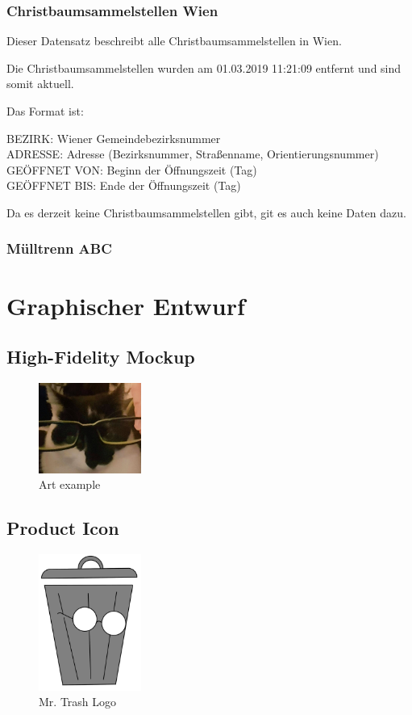 \documentclass[12pt, a4paper]{scrreprt}
\begin{document}
\subsection{Christbaumsammelstellen Wien \cite{christbaumsammelstellen}}
    Dieser Datensatz beschreibt alle Christbaumsammelstellen in Wien.

    Die Christbaumsammelstellen wurden am 01.03.2019 11:21:09 entfernt und sind somit aktuell.

    Das Format ist:
    \begin{tcolorbox}
        BEZIRK: Wiener Gemeindebezirksnummer\\
        ADRESSE: Adresse (Bezirksnummer, Straßenname, Orientierungsnummer)\\
        GEÖFFNET VON: Beginn der Öffnungszeit (Tag)\\
        GEÖFFNET BIS: Ende der Öffnungszeit (Tag) 
    \end{tcolorbox}
    
    Da es derzeit keine Christbaumsammelstellen gibt, git es auch keine Daten dazu.
\subsection{Mülltrenn ABC \cite{muelltrennabc}}



\chapter{Graphischer Entwurf} 

\section{High-Fidelity Mockup}
\begin{figure}[h]
\centering
\includegraphics[width=0.3\textwidth]{../graphical/test.jpg}
\caption{\label{fig:art1} Art example}
\end{figure}

\section{Product Icon}
\begin{figure}[h]
\centering
\includegraphics[width=0.3\textwidth]{../graphical/logo_draft_color.png}
\caption{\label{fig:logo} Mr. Trash Logo}
\end{figure}



\end{document}
